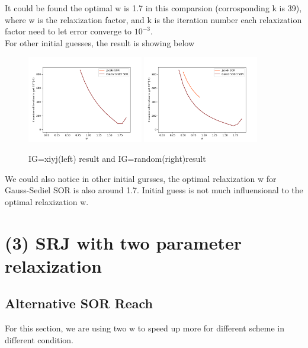 \documentclass[12pt]{article}
\begin{document}
It could be found the optimal w is 1.7 in this comparsion (corrosponding
k is 39), where w is the relaxization factor, and k is the iteration 
number each relaxization factor need to let error converge to $10^{-3}$.\\



For other initial guesses, the result is showing below

    
\begin{figure}[H]
    \centering
    \includegraphics[width=0.45\textwidth]{SORIG2.png}
    \includegraphics[width=0.45\textwidth]{SORIGR.png}
    \label{SORIG2.png}
    \caption{IG=xiyj(left) result and IG=random(right)result }
\end{figure}


We could also notice in other initial gursses, the optimal relaxization 
w for Gauss-Sediel SOR is also around 1.7. Initial guess is not much
influensional to the optimal relaxization w.





\section{(3) SRJ with two parameter relaxization }


\subsection{Alternative SOR Reach}
For this section, we are using two w to speed up more for different scheme
in different condition. \\
\end{document}
